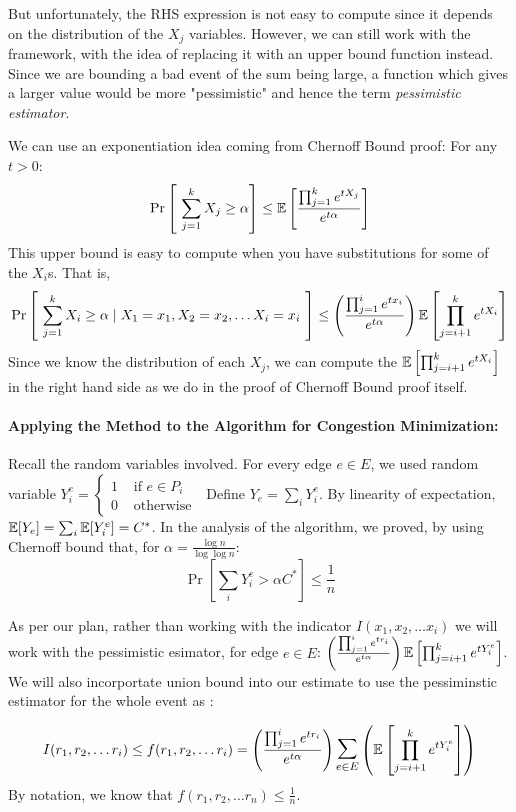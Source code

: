 But unfortunately, the RHS expression is not easy to compute since it depends on the distribution of the $X_j$ variables. However, we can still work with the framework, with the idea of replacing it with an upper bound function instead. Since we are bounding a bad event of the sum being large, a function which gives a larger value  would be more "pessimistic" and hence the term {\em pessimistic estimator}.

We can use an exponentiation idea coming from Chernoff Bound proof: For any $t > 0$:
$$\Pr\left[ ~\sum_{j=1}^k X_j \ge \alpha \right] \le {\mathbb E} \left[ \frac{\prod_{j=1}^k e^{tX_j}}{e^{t\alpha}} \right] $$
This upper bound is easy to compute when you have substitutions for some of the $X_i$s. That is,
$$\Pr\left[ ~\sum_{j=1}^k X_i \ge \alpha \mid X_1 = x_1, X_2 = x_2, \ldots X_i = x_i~\right] \le \left( \frac{\prod_{j=1}^i e^{tx_i}}{e^{t\alpha}} \right) {\mathbb E} \left[  \prod_{j={i+1}}^k e^{tX_i} \right]$$
Since we know the distribution of each $X_j$, we can compute the ${\mathbb E} \left[  \prod_{j={i+1}}^k e^{tX_i} \right]$ in the right hand side as we do in the proof of Chernoff Bound proof itself.

\paragraph{Applying the Method to the Algorithm for Congestion Minimization:}

Recall the random variables involved.
For every edge $e \in E$, we used random variable 
$Y_i^e = 
\begin{cases}
1 & \textrm{ if $e \in P_i$ }\\
0 & \textrm{ otherwise }
\end{cases}
$
\noindent Define $Y_e = \sum_{i} Y_i^e$. By linearity of expectation, ${\mathbb E}[Y_e] = \sum_i {\mathbb E}[Y_i^e] = C^*$.
In the analysis of the algorithm, we proved, by using Chernoff bound that, for $\alpha = \frac{\log n}{\log \log n}$:
$$\Pr \left[ \sum_i Y_i^e > \alpha C^* \right] \le \frac{1}{n}$$

As per our plan, rather than working with the indicator $I(x_1, x_2, \ldots x_i)$ we will work with the pessimistic esimator, for edge $e \in E$:
$\left( \frac{\prod_{j=1}^i e^{tr_i}}{e^{t\alpha}} \right) {\mathbb E} \left[  \prod_{j={i+1}}^k e^{tY_i^e} \right]$. We will also incorportate union bound into our estimate to use the pessiminstic estimator for the whole event as :

$$ I(r_1, r_2, \ldots r_i) \le f(r_1, r_2, \ldots r_i) = \left( \frac{\prod_{j=1}^i e^{tr_i}}{e^{t\alpha}} \right) \bigsum_{e \in E} \left( \E \left[  \prod_{j={i+1}}^k e^{tY_i^e} \right] \right) $$
By notation, we know that $f(r_1, r_2, \ldots r_n) \le \frac{1}{n}$.

